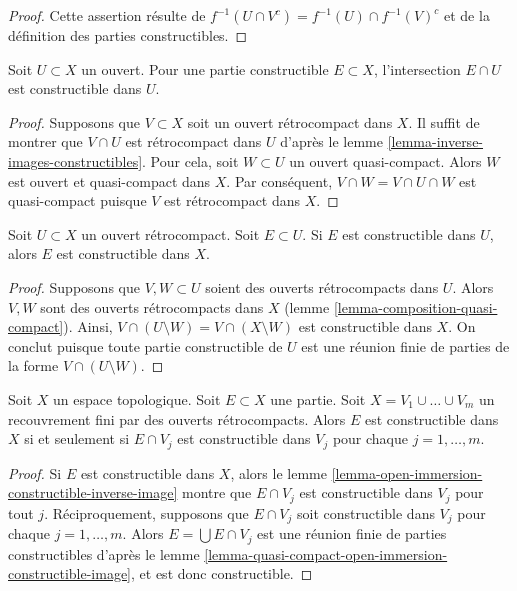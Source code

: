 \begin{proof}
Cette assertion résulte de $f^{-1}(U \cap V^c) = f^{-1}(U) \cap f^{-1}(V)^c$
et de la définition des parties constructibles.
\end{proof}

\begin{lemma}
\label{lemma-open-immersion-constructible-inverse-image}
Soit $U \subset X$ un ouvert. Pour une partie constructible
$E \subset X$, l'intersection $E \cap U$ est constructible
dans $U$.
\end{lemma}

\begin{proof}
Supposons que $V \subset X$ soit un ouvert rétrocompact dans $X$.
Il suffit de montrer que $V \cap U$ est rétrocompact dans $U$
d'après le lemme \ref{lemma-inverse-images-constructibles}. Pour cela,
soit $W \subset U$ un ouvert quasi-compact. Alors $W$
est ouvert et quasi-compact dans $X$. Par conséquent, $V \cap W = V \cap U \cap W$
est quasi-compact puisque $V$ est rétrocompact dans $X$.
\end{proof}

\begin{lemma}
\label{lemma-quasi-compact-open-immersion-constructible-image}
Soit $U \subset X$ un ouvert rétrocompact. Soit $E \subset U$.
Si $E$ est constructible dans $U$, alors $E$ est constructible dans $X$.
\end{lemma}

\begin{proof}
Supposons que $V, W \subset U$ soient des ouverts rétrocompacts dans $U$.
Alors $V, W$ sont des ouverts rétrocompacts dans $X$
(lemme \ref{lemma-composition-quasi-compact}).
Ainsi, $V \cap (U \setminus W) = V \cap (X \setminus W)$
est constructible dans $X$. On conclut puisque toute partie constructible de $U$
est une réunion finie de parties de la forme $V \cap (U \setminus W)$.
\end{proof}

\begin{lemma}
\label{lemma-collate-constructible}
Soit $X$ un espace topologique. Soit $E \subset X$ une partie.
Soit $X = V_1 \cup \ldots \cup V_m$ un recouvrement fini par des
ouverts rétrocompacts.
Alors $E$ est constructible dans $X$ si et seulement si $E \cap V_j$
est constructible dans $V_j$ pour chaque $j = 1, \ldots, m$.
\end{lemma}

\begin{proof}
Si $E$ est constructible dans $X$, alors le
lemme \ref{lemma-open-immersion-constructible-inverse-image}
montre que $E \cap V_j$ est constructible dans $V_j$ pour tout $j$.
Réciproquement, supposons que $E \cap V_j$
soit constructible dans $V_j$ pour chaque $j = 1, \ldots, m$.
Alors $E = \bigcup E \cap V_j$ est une réunion finie de
parties constructibles d'après le
lemme \ref{lemma-quasi-compact-open-immersion-constructible-image},
et est donc constructible.
\end{proof}


